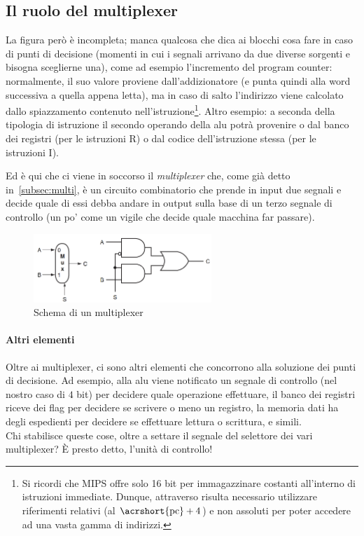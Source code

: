 \documentclass[class=book, crop=false, oneside]{standalone}
\begin{document}
\subsection{Il ruolo del multiplexer}
La  figura però è incompleta; manca qualcosa che dica ai blocchi cosa fare in caso di punti di decisione (momenti in cui i segnali arrivano da due diverse sorgenti e bisogna sceglierne una), come ad esempio l'incremento del program counter: normalmente, il suo valore proviene dall'addizionatore (e punta quindi alla word successiva a quella appena letta), ma in caso di salto l'indirizzo viene calcolato dallo spiazzamento contenuto nell'istruzione\footnote{Si ricordi che MIPS offre solo 16 bit per immagazzinare costanti all'interno di istruzioni immediate. Dunque, attraverso  risulta necessario utilizzare riferimenti relativi (al \(\textrm{\acrshort{pc}}+4\)) e non assoluti per poter accedere ad una vasta gamma di indirizzi.}. Altro esempio: a seconda della tipologia di istruzione il secondo operando della \acrshort{alu} potrà provenire o dal banco dei registri (per le istruzioni R) o dal codice dell'istruzione stessa (per le istruzioni I).

Ed è qui che ci viene in soccorso il \emph{multiplexer} che, come già detto in~\ref{subsec:multi}, è un circuito combinatorio che prende in input due segnali e decide quale di essi debba andare in output sulla base di un terzo segnale di controllo (un po' come un vigile che decide quale macchina far passare).
\begin{figure}[H]
	\centering
	\includegraphics[width=0.6\textwidth,keepaspectratio]{muxx}
	\caption{Schema di un multiplexer}
\end{figure}
\paragraph{Altri elementi}
Oltre ai multiplexer, ci sono altri elementi che concorrono alla soluzione dei punti di decisione. Ad esempio, alla \acrshort{alu} viene notificato un segnale di controllo (nel nostro caso di \(4\) bit) per decidere quale operazione effettuare, il banco dei registri riceve dei flag per decidere se scrivere o meno un registro, la memoria dati ha degli espedienti per decidere se effettuare lettura o scrittura, e simili.\\
Chi stabilisce queste cose, oltre a settare il segnale del selettore dei vari multiplexer? È presto detto, l’unità di controllo!
\end{document}
